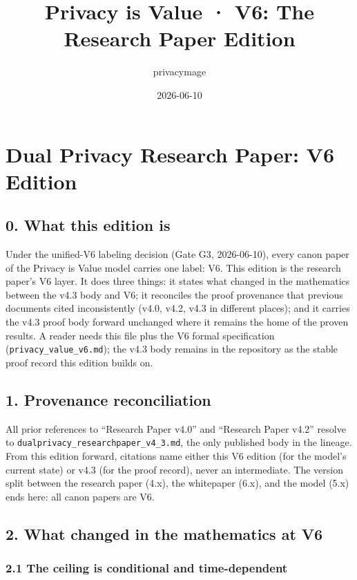 \documentclass[
]{article}
\title{Privacy is Value · V6: The Research Paper Edition}
\author{privacymage}
\date{2026-06-10}
\begin{document}
\maketitle

\section{Dual Privacy Research Paper: V6
Edition}\label{dual-privacy-research-paper-v6-edition}

\subsection{0. What this edition is}\label{what-this-edition-is}

Under the unified-V6 labeling decision (Gate G3, 2026-06-10), every
canon paper of the Privacy is Value model carries one label: V6. This
edition is the research paper's V6 layer. It does three things: it
states what changed in the mathematics between the v4.3 body and V6; it
reconciles the proof provenance that previous documents cited
inconsistently (v4.0, v4.2, v4.3 in different places); and it carries
the v4.3 proof body forward unchanged where it remains the home of the
proven results. A reader needs this file plus the V6 formal
specification (\texttt{privacy\_value\_v6.md}); the v4.3 body remains in
the repository as the stable proof record this edition builds on.

\subsection{1. Provenance
reconciliation}\label{provenance-reconciliation}

All prior references to ``Research Paper v4.0'' and ``Research Paper
v4.2'' resolve to \texttt{dualprivacy\_researchpaper\_v4\_3.md}, the
only published body in the lineage. From this edition forward, citations
name either this V6 edition (for the model's current state) or v4.3 (for
the proof record), never an intermediate. The version split between the
research paper (4.x), the whitepaper (6.x), and the model (5.x) ends
here: all canon papers are V6.

\subsection{2. What changed in the mathematics at
V6}\label{what-changed-in-the-mathematics-at-v6}

\subsubsection{2.1 The ceiling is conditional and
time-dependent}\label{the-ceiling-is-conditional-and-time-dependent}
\end{document}
